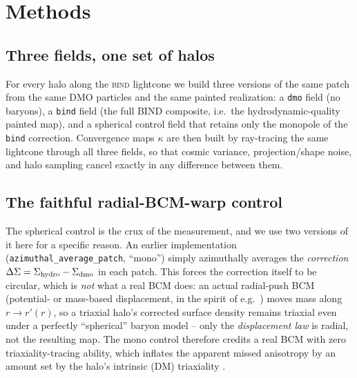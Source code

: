 \documentclass[11pt]{article}
\newcommand{\bind}{\textsc{bind}}
\begin{document}
\section{Methods}\label{sec:methods}

\subsection{Three fields, one set of halos}\label{sec:fields}

For every halo along the \bind{} lightcone we build three versions of the
same patch from the same DMO particles and the same painted realization:
a \texttt{dmo} field (no baryons), a \texttt{bind} field (the full BIND
composite, i.e.\ the hydrodynamic-quality painted map), and a spherical
control field that retains only the monopole of the \texttt{bind}
correction. Convergence maps $\kappa$ are then built by ray-tracing the
same lightcone through all three fields, so that cosmic variance,
projection/shape noise, and halo sampling cancel exactly in any
difference between them.

\subsection{The faithful radial-BCM-warp control}\label{sec:control}

The spherical control is the crux of the measurement, and we use two
versions of it here for a specific reason. An earlier implementation
(\texttt{azimuthal\_average\_patch}, ``mono'') simply azimuthally averages
the \emph{correction} $\Delta\Sigma=\Sigma_{\rm hydro}-\Sigma_{\rm dmo}$ in
each patch. This forces the correction itself to be circular, which is
\emph{not} what a real BCM does: an actual radial-push BCM (potential- or
mass-based displacement, in the spirit of e.g.\ \citealt{dai_feng_seljak2018})
moves mass along $r\to r'(r)$, so a triaxial halo's corrected surface
density remains triaxial even under a perfectly ``spherical'' baryon
model -- only the \emph{displacement law} is radial, not the resulting
map. The mono control therefore credits a real BCM with zero
triaxiality-tracing ability, which inflates the apparent missed
anisotropy by an amount set by the halo's intrinsic (DM) triaxiality
\citep{osato_triaxiality}.
\end{document}
